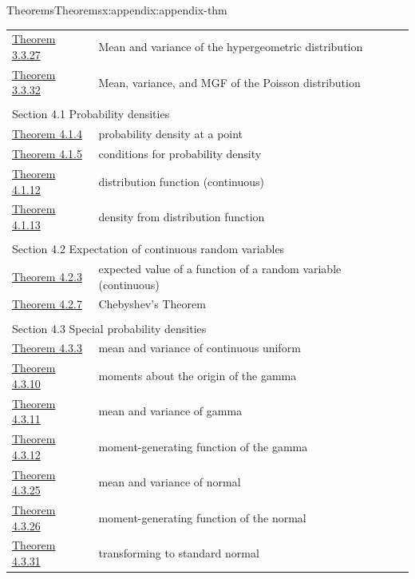 \documentclass[oneside,10pt,]{book}
\numberwithin{equation}{section}
\begin{document}
\begin{appendixptx}{Theorems}{}{Theorems}{}{}{x:appendix:appendix-thm}
\begin{longtable}[l]{ll}
\hyperref[g:theorem:idp140361459569280]{Theorem 3.3.27}& Mean and variance of the hypergeometric distribution\\
\hyperref[g:theorem:idp140361459590528]{Theorem 3.3.32}& Mean, variance, and MGF of the Poisson distribution\\
\multicolumn{2}{l}{\null}\\[1.5ex] \multicolumn{2}{l}{\large Section 4.1 Probability densities}\\[0.5ex]
\hyperref[x:theorem:thm-continuous-point]{Theorem 4.1.4}& probability density at a point\\
\hyperref[x:theorem:thm-continuous-conditions-3-1]{Theorem 4.1.5}& conditions for probability density\\
\hyperref[x:theorem:thm-continuous-th-3-2]{Theorem 4.1.12}& distribution function (continuous)\\
\hyperref[x:theorem:thm-pdf-cdf]{Theorem 4.1.13}& density from distribution function\\
\multicolumn{2}{l}{\null}\\[1.5ex] \multicolumn{2}{l}{\large Section 4.2 Expectation of continuous random variables}\\[0.5ex]
\hyperref[x:theorem:thm-expected-value-function-random-variable-4-1-cont]{Theorem 4.2.3}& expected value of a function of a random variable (continuous)\\
\hyperref[x:theorem:thm-chebyshev]{Theorem 4.2.7}& Chebyshev's Theorem\\
\multicolumn{2}{l}{\null}\\[1.5ex] \multicolumn{2}{l}{\large Section 4.3 Special probability densities}\\[0.5ex]
\hyperref[x:theorem:thm-cont-unif-mean]{Theorem 4.3.3}& mean and variance of continuous uniform\\
\hyperref[x:theorem:thm-cont-gamma-moments]{Theorem 4.3.10}& moments about the origin of the gamma\\
\hyperref[x:theorem:thm-cont-gamma-mean]{Theorem 4.3.11}& mean and variance of gamma\\
\hyperref[x:theorem:thm-cont-gamma-mgf]{Theorem 4.3.12}& moment-generating function of the gamma\\
\hyperref[x:theorem:thm-cont-normal-mean]{Theorem 4.3.25}& mean and variance of normal\\
\hyperref[x:theorem:thm-cont-normal-mgf]{Theorem 4.3.26}& moment-generating function of the normal\\
\hyperref[x:theorem:thm-cont-std-normal]{Theorem 4.3.31}& transforming to standard normal\\

\end{longtable}
\end{appendixptx}
\end{document}

